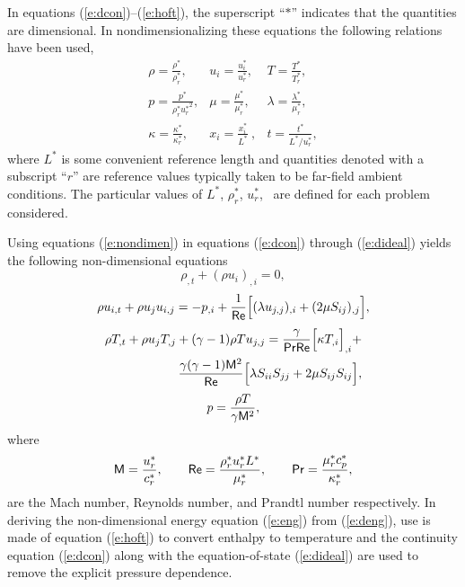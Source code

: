 In equations (\ref{e:dcon})--(\ref{e:hoft}), the superscript ``$*$''
indicates that the quantities are dimensional. In nondimensionalizing these
equations the following relations have been used,
%
\begin{equation} \label{e:nondimen}
  \begin{array}{lll}
    \rho    = \frac{\rho^*}{\rho^*_r} , & 
    u_i     = \frac{{u^*_i}}{u^*_r} , &
    T       = \frac{{T^*}}{T^*_r} , \\[0.1in]
    p       = \frac{{p^*}}{\rho^*_r {u^*_r}^2} , &
    \mu     = \frac{\mu^*}{\mu^*_r} , &
    \lambda = \frac{\lambda^*}{\mu^*_r} , \\[0.1in]
    \kappa  = \frac{\kappa^*}{\kappa^*_r} , &
    x_i     = \frac{{x^*_i}}{L^*} \ , &
    t       = \frac{{t^*}}{L^* / u^*_r} , \nonumber
  \end{array}
\end{equation}
%
where $L^*$ is some convenient reference length and quantities denoted with a
subscript ``$r$'' are reference values typically taken to be far-field
ambient conditions.  The particular values of $L^*$, $\rho^*_r$,
$u^*_r$, \etc\ are defined for each problem considered.

Using equations (\ref{e:nondimen}) in equations (\ref{e:dcon}) through
(\ref{e:dideal}) yields the following non-dimensional equations
%
  \begin{equation} \label{e:con}
    \rho_{,t} + \left(\rho u_i \right)_{,i} = 0 ,
  \end{equation}
  \begin{equation} \label{e:mom}
    \rho u_{i,t} + \rho u_{j} u_{i,j} =  -p_{,i} + 
    {1\over{\Re}}\Big[(\lambda u_{j,j})_{,i} + (2 \mu S_{ij})_{,j}\Big] ,
  \end{equation}
  \begin{eqnarray} \label{e:eng}
    \rho T_{,t} + \rho u_{j} T_{,j} + (\gamma - 1) \rho T u_{j,j} =  
    \frac{\gamma}{\Pr\Re} \Big[ \kappa T_{,i} \Big]_{,i} + \nonumber \\
    {{\gamma (\gamma-1) \M^2}\over{\Re}} 
    \Big[ \lambda S_{ii} S_{jj} + 2 \mu S_{ij} S_{ij} \Big] ,
  \end{eqnarray}
  \begin{equation} \label{e:ideal}
    p = \frac{\rho T}{\gamma \M^2} ,
  \end{equation}
%
where 
%
\begin{equation}
  \M =  \frac{u^*_r}{c^*_r} , \qquad 
  \Re = \frac{\rho^*_r u^*_r L^*}{\mu^*_r} , \qquad
  \Pr = \frac{\mu^*_r \cp^*}{\kappa^*_r} , 
\end{equation}
%
are the Mach number, Reynolds number, and Prandtl number respectively.  In
deriving the non-dimensional energy equation (\ref{e:eng}) from
(\ref{e:deng}), use is made of equation (\ref{e:hoft}) to convert enthalpy to
temperature and the continuity equation (\ref{e:dcon}) along with the
equation-of-state (\ref{e:dideal}) are used to remove the explicit pressure
dependence.

